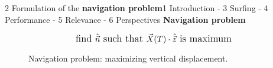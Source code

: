 \begin{frame}{2 Formulation of the \textbf{navigation problem}}{1 Introduction - 3 Surfing - 4 Performance - 5 Relevance - 6 Perspectives}
	\centering
	\vspace{10pt}
	\textbf{\Large Navigation problem}

	\pause
	\vspace{-10pt}
	\begin{equation*}
		\large
		\text{find} ~ \hat{\vec{n}} ~ \text{such that} ~ \vec{X}(T) \cdot \hat{\vec{z}} ~ \text{is maximum}
	\end{equation*}

	\vspace{5pt}
	\begin{figure}
		\caption{
			Navigation problem: maximizing vertical displacement.
		}
	\end{figure}
\end{frame}

